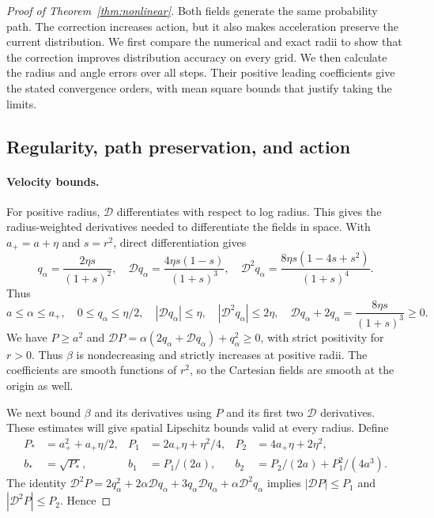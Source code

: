 \begin{proof}[Proof of Theorem~\ref{thm:nonlinear}]
\label{proof:nonlinear}
Both fields generate the same probability path. The correction increases action, but it also makes acceleration preserve the current distribution. We first compare the numerical and exact radii to show that the correction improves distribution accuracy on every grid. We then calculate the radius and angle errors over all steps. Their positive leading coefficients give the stated convergence orders, with mean square bounds that justify taking the limits.

\subsection{Regularity, path preservation, and action}

\paragraph{Velocity bounds.}
For positive radius, $\mathcal D$ differentiates with respect to log radius. This gives the radius-weighted derivatives needed to differentiate the fields in space. With $a_+=a+\eta$ and $s=r^2$, direct differentiation gives
\[
 q_\alpha=\frac{2\eta s}{(1+s)^2},\quad
 \mathcal D q_\alpha=\frac{4\eta s(1-s)}{(1+s)^3},\quad
 \mathcal D^2q_\alpha=\frac{8\eta s(1-4s+s^2)}{(1+s)^4}.
\]
Thus
\[
 a\le\alpha\le a_+,\quad0\le q_\alpha\le\eta/2,\quad
 |\mathcal D q_\alpha|\le\eta,\quad|\mathcal D^2q_\alpha|\le2\eta,\quad
 \mathcal D q_\alpha+2q_\alpha=\frac{8\eta s}{(1+s)^3}\ge0.
\]
We have $P\ge a^2$ and $\mathcal D P=\alpha(2q_\alpha+\mathcal D q_\alpha)+q_\alpha^2\ge0$, with strict positivity for $r>0$. Thus $\beta$ is nondecreasing and strictly increases at positive radii. The coefficients are smooth functions of $r^2$, so the Cartesian fields are smooth at the origin as well.

We next bound $\beta$ and its derivatives using $P$ and its first two $\mathcal D$ derivatives. These estimates will give spatial Lipschitz bounds valid at every radius. Define
\begin{align*}
 P_*&=a_+^2+a_+\eta/2,&P_1&=2a_+\eta+\eta^2/4,&P_2&=4a_+\eta+2\eta^2,\\
 b_*&=\sqrt{P_*},&b_1&=P_1/(2a),&b_2&=P_2/(2a)+P_1^2/(4a^3).
\end{align*}
The identity $\mathcal D^2P=2q_\alpha^2+2\alpha \mathcal D q_\alpha+3q_\alpha\mathcal D q_\alpha+\alpha \mathcal D^2q_\alpha$ implies
$|\mathcal D P|\le P_1$ and $|\mathcal D^2P|\le P_2$. Hence


\end{proof}
